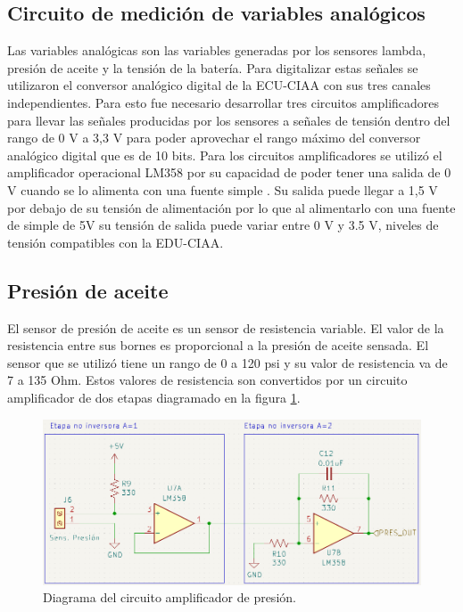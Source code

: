 \subsection{Circuito de medición de variables analógicos}

Las variables analógicas son las variables generadas por los sensores lambda, presión de aceite y la tensión de la batería. Para digitalizar estas señales se utilizaron el conversor analógico digital de la ECU-CIAA con sus tres canales independientes. Para esto fue necesario desarrollar tres circuitos amplificadores para llevar las señales producidas por los sensores a señales de tensión dentro del rango de 0 V a 3,3 V para poder aprovechar el rango máximo del conversor analógico digital que es de 10 bits. Para los circuitos amplificadores se utilizó el amplificador operacional LM358 por su capacidad de poder tener una salida de 0 V cuando se lo alimenta con una fuente simple \cite{lm358}. Su salida puede llegar a 1,5 V por debajo de su tensión de alimentación por lo que al alimentarlo con una fuente de simple de 5V su tensión de salida puede variar entre 0 V y 3.5 V, niveles de tensión compatibles con la EDU-CIAA.

\subsection{Presión de aceite}

El sensor de presión de aceite es un sensor de resistencia variable. El valor de la resistencia entre sus bornes es proporcional a la presión de aceite sensada. El sensor que se utilizó tiene un rango de 0 a 120 psi y su valor de resistencia va de 7 a 135 Ohm. Estos valores de resistencia son convertidos por un circuito amplificador de dos etapas diagramado en la figura \ref{fig:circuito-presion}.

\begin{figure}[htpb]
\centering
\includegraphics[width=.9\textwidth]{./Figures/circuito-presion.png}
\caption{Diagrama del circuito amplificador de presión.}
\label{fig:circuito-presion}
\end{figure}

